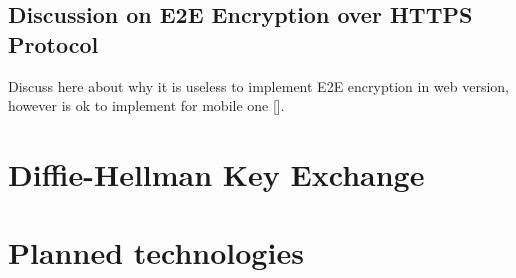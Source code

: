 \subsection{Discussion on E2E Encryption over HTTPS Protocol}\label{subsec:discussion-on-e2e-encryption-over-https-protocol}
Discuss here about why it is useless to implement E2E encryption in web version,
however is ok to implement for mobile one [\cite{JsMathRandom, E2eVsTLS}].

\section{Diffie-Hellman Key Exchange}\label{sec:diffie-hellman-key-exchange}



\section{Planned technologies}\label{sec:planned-technologies}

